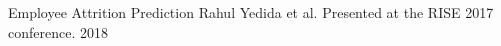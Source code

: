 \begin{cvhonors}
  \cvhonor
    {Employee Attrition Prediction}
    {Rahul Yedida et al. Presented at the RISE 2017 conference.}
    {}
    {2018}

\end{cvhonors}
